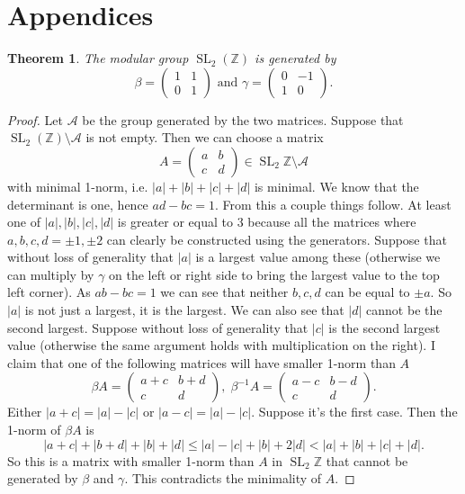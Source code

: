 \documentclass[titlepage,a4paper]{article}
\theoremstyle{theoremdd}
\newtheorem{theorem}{Theorem}[section]
\theoremstyle{definitiondd}
\theoremstyle{remarkdd}
\newcommand{\Z}{\mathbb{Z}}
\DeclareMathOperator{\SL}{SL}
\begin{document}
\section{Appendices}
\begin{theorem}
	The modular group $\SL_2(\Z)$ is generated by \[ 	
	\beta = \begin{pmatrix}  1 & 1 \\ 0 & 1 \end{pmatrix} 
	\text{ and }
	\gamma =  \begin{pmatrix} 0 & -1 \\ 1 & 0 \end{pmatrix} 
.\] 
\end{theorem}
\begin{proof}
	Let $\mathcal{A} $ be the group generated by the two matrices. 
	Suppose that $\SL_2(\Z) \setminus \mathcal{A} $ is not empty.
	Then we can choose a matrix \[
		A =\begin{pmatrix} a & b \\ c& d\end{pmatrix} \in \SL_2\Z \setminus \mathcal{A} 
	\] 
	with minimal 1-norm, i.e. $|a| + |b| + |c| + |d|$ is minimal.
	We know that the determinant is one, hence $ad- bc = 1$. From this a couple things follow. At least one of  $|a|, |b|,|c|,|d|$ is greater or equal to 3 because all the matrices where $a, b, c, d = \pm 1, \pm 2$ can clearly be constructed using the generators. Suppose that without loss of generality that $|a|$ is a largest value among these (otherwise we can multiply by $\gamma$ on the left or right side to bring the largest value to the top left corner).
	As  $ab - bc = 1$ we can see that neither  $b, c, d$ can be equal to $\pm a$.  
	So  $|a|$ is not just a largest, it is the largest. 
	We can also see that $|d|$ cannot be the second largest. 
	Suppose without loss of generality that $|c|$ is the second largest value (otherwise the same argument holds with multiplication on the right).
	I claim that one of the following matrices will have smaller 1-norm than $A$ \[
		\beta A = \begin{pmatrix} a + c & b + d  \\ c & d\end{pmatrix}, \; \beta^{-1} A = \begin{pmatrix} a - c & b - d \\ c & d \end{pmatrix} 
	.\]
	Either $|a + c| = |a| - |c|$ or  $|a - c| =  |a|  - |c|$. Suppose it's the first case. 
	Then the 1-norm of $\beta A$ is
	 \[
	|a + c| + |b + d| + |b| + |d| \le |a| - |c| + |b| + 2|d| < |a| + |b| + |c| + |d|
	.\] 
	So this is a matrix with smaller 1-norm than $A$ in $\SL_2\Z$ that cannot be generated by $\beta$ and  $\gamma$. 
	This contradicts the minimality of $A$. 
\end{proof}
\end{document}

